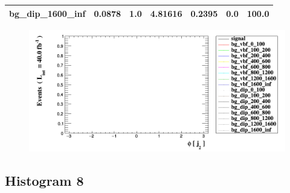 \documentclass[a4paper, 10pt]{article}
\begin{document}
\begin{table}[H]
\begin{center}
\begin{tabular}{|m{23.0mm}|m{23.0mm}|m{18.0mm}|m{19.0mm}|m{19.0mm}|m{19.0mm}|m{19.0mm}|}
      \hline
      {\cellcolor{white}         bg\_dip\_1600\_inf}& {\cellcolor{white}         0.0878}& {\cellcolor{white}         1.0}& {\cellcolor{white}         4.81616}& {\cellcolor{white}         0.2395}& {\cellcolor{red}         0.0}& {\cellcolor{red}         100.0}\\
\hline
    \end{tabular}
  \end{center}
\end{table}

\begin{figure}[H]
  \begin{center}
    \includegraphics[scale=0.45]{selection_6.png}\\
\caption{   }
  \end{center}
\end{figure}
      \newpage
\subsection{ Histogram 8}
\end{document}
